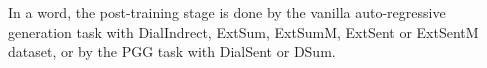 In a word, the post-training stage is done by the vanilla auto-regressive generation task with DialIndrect, ExtSum, ExtSumM, ExtSent or ExtSentM dataset, or by the PGG task with DialSent or DSum.


%

